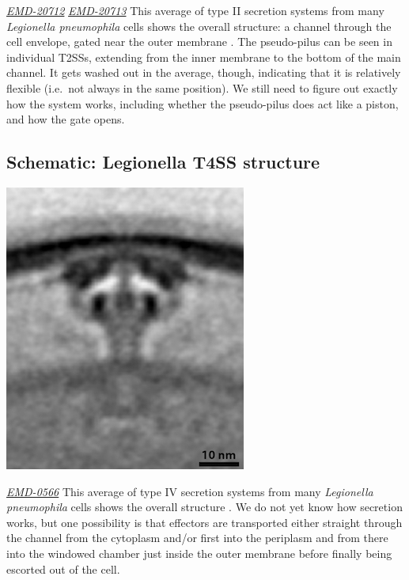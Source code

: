 \documentclass[]{tufte-book}
\begin{document}
\href{https://www.ebi.ac.uk/pdbe/entry/emdb/EMD-20712}{\emph{EMD-20712}} \href{https://www.ebi.ac.uk/pdbe/entry/emdb/EMD-20713}{\emph{EMD-20713}}
This average of type II secretion systems from many \emph{Legionella pneumophila} cells shows the overall structure: a channel through the cell envelope, gated near the outer membrane \citep{ghosal2019}. The pseudo-pilus can be seen in individual T2SSs, extending from the inner membrane to the bottom of the main channel. It gets washed out in the average, though, indicating that it is relatively flexible (i.e.~not always in the same position). We still need to figure out exactly how the system works, including whether the pseudo-pilus does act like a piston, and how the gate opens.

\hypertarget{Legionella_T4SS_structure}{%
\subsection*{Schematic: Legionella T4SS structure}\label{Legionella_T4SS_structure}}

\includegraphics{img/schematics/9_3_2}

\href{https://www.ebi.ac.uk/pdbe/entry/emdb/EMD-0566}{\emph{EMD-0566}}
This average of type IV secretion systems from many \emph{Legionella pneumophila} cells shows the overall structure \citep{ghosal2019a}. We do not yet know how secretion works, but one possibility is that effectors are transported either straight through the channel from the cytoplasm and/or first into the periplasm and from there into the windowed chamber just inside the outer membrane before finally being escorted out of the cell.
\end{document}
